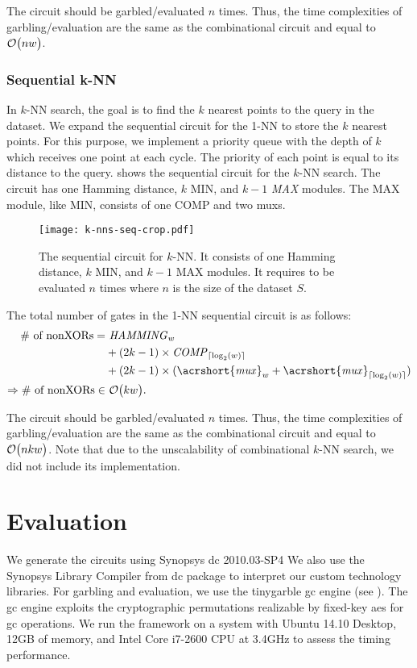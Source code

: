 The circuit should be garbled/evaluated $n$ times.
Thus, the time complexities of garbling/evaluation are the same as the combinational circuit and equal to $\mathcal{O}\bigl(nw\bigr)$.

\subsubsection{Sequential k-NN}
In $k$-NN search, the goal is to find the $k$ nearest points to the query in the dataset.
We expand the sequential circuit for the 1-NN to store the $k$ nearest points.
For this purpose, we implement a priority queue with the depth of $k$ which receives one point at each cycle.
The priority of each point is equal to its distance to the query.
 shows the sequential circuit for the $k$-NN search.
The circuit has one Hamming distance, $k$ MIN, and $k-1$ \emph{MAX} modules.
The MAX module, like MIN, consists of one COMP and two \acrshort{mux}s.

\begin{figure}
\centering
\texttt{[image: k-nns-seq-crop.pdf]}
\caption{The sequential circuit for $k$-NN.
It consists of one Hamming distance, $k$ MIN, and $k-1$ MAX modules.
It requires to be evaluated $n$ times where $n$ is the size of the dataset $S$.}
\label{fig:k-nns-seq}
\end{figure}

The total number of gates in the 1-NN sequential circuit is as follows:
\begin{align*}
\text{\# of nonXORs}=			& ~ \mathit{HAMMING}_{w}\\
								& + (2k-1) \times \mathit{COMP}_{\lceil \log _2(w) \rceil} \\
								& + (2k-1) \times (\mathit{\acrshort{mux}}_w  + \mathit{\acrshort{mux}}_{\lceil \log _2(w) \rceil})\\
\Rightarrow \text{\# of nonXORs} \in & ~ \BigO{kw}.
\end{align*}

The circuit should be garbled/evaluated $n$ times.
Thus, the time complexities of garbling/evaluation are the same as the combinational circuit and equal to $\mathcal{O}\bigl(nkw\bigr)$.
Note that due to the unscalability of combinational $k$-NN search, we did not include its implementation.

\section{Evaluation}\label{sec:knn-eval}
We generate the circuits using Synopsys \acrfull{dc} 2010.03-SP4
We also use the Synopsys Library Compiler from \acrshort{dc} package to interpret our custom technology libraries.
For garbling and evaluation, we use the \gls{tinygarble} \acrshort{gc} engine (see ).
The \acrshort{gc} engine exploits the cryptographic permutations realizable by fixed-key \acrshort{aes} for \acrshort{gc} operations.
We run the framework on a system with Ubuntu 14.10 Desktop, 12GB of memory, and Intel Core i7-2600 CPU at 3.4GHz to assess the timing performance.

